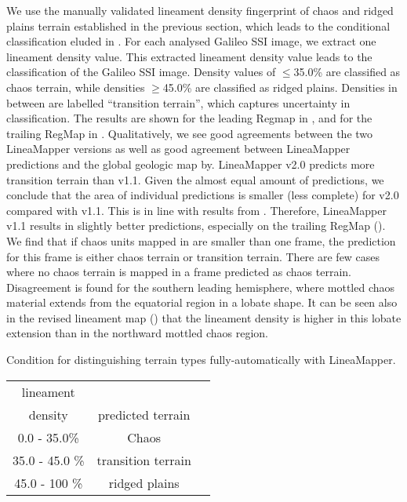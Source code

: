 We use the manually validated lineament density fingerprint of chaos and ridged plains terrain established in the previous section, which leads to the conditional classification eluded in . For each analysed Galileo SSI image, we extract one lineament density value. This extracted lineament density value leads to the classification of the Galileo SSI image. Density values of $\leq$35.0\% are classified as chaos terrain, while densities $\geq$45.0\% are classified as ridged plains. Densities in between are labelled ``transition terrain'', which captures uncertainty in classification. The results are shown for the leading Regmap in , and for the trailing RegMap in . Qualitatively, we see good agreements between the two LineaMapper versions as well as good agreement between LineaMapper predictions and the global geologic map by. LineaMapper v2.0 predicts more transition terrain than v1.1. Given the almost equal amount of predictions, we conclude that the area of individual predictions is smaller (less complete) for v2.0 compared with v1.1. This is in line with results from . Therefore, LineaMapper v1.1 results in slightly better predictions, especially on the trailing RegMap (). We find that if chaos units mapped in are smaller than one frame, the prediction for this frame is either chaos terrain or transition terrain. There are few cases where no chaos terrain is mapped in a frame predicted as chaos terrain. Disagreement is found for the southern leading hemisphere, where mottled chaos material extends from the equatorial region in a lobate shape. It can be seen also in the revised lineament map () that the lineament density is higher in this lobate extension than in the northward mottled chaos region. 

\begin{margintable}[]\scriptsize
\caption{Condition for distinguishing terrain types fully-automatically with LineaMapper.}
\label{tab:condition_ch_pr}
\begin{tabular}{@{}ccc@{}}
\toprule
lineament \\ density & predicted terrain \\ \midrule
0.0 - 35.0\% & Chaos \\
35.0 - 45.0 \% & transition terrain \\
45.0 - 100 \% & ridged plains \\ \bottomrule
\end{tabular}
\end{margintable}

